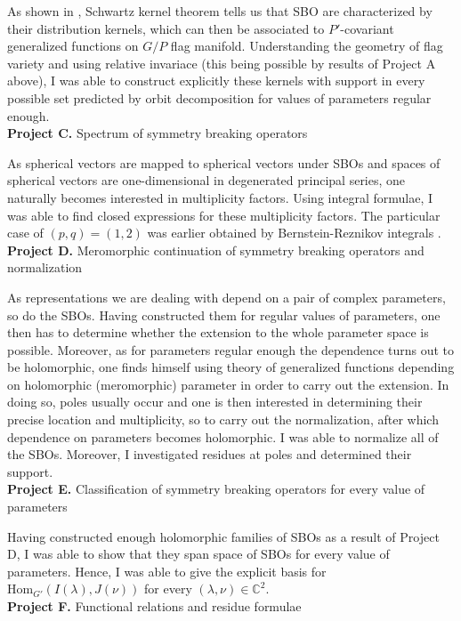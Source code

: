 \documentclass[11pt,a4paper,twoside]{jarticle}
\newcommand{\研究課題名}{Symmetry breaking operators}
\newcommand{\研究機関名}{東京大学}
\newcommand{\申請者氏名}{レオンチエフ\,オレクシィ}
\newcommand{\研究代表者氏名}{\申請者氏名}
\newcommand{\研究期間の最終元号年度}{31}	%
\begin{document}
{	As shown in \cite{KS15},
	Schwartz kernel theorem tells us that SBO are characterized by their distribution kernels,
	which can then be associated to $P'$-covariant generalized functions on $G/P$ flag manifold.
	Understanding the geometry of flag variety and using relative invariace (this being possible by results of Project A above),
	I was able to construct explicitly these kernels with support in every possible set predicted by orbit decomposition for values of parameters regular enough.\\
	\textbf{Project C.} Spectrum of symmetry breaking operators

	As spherical vectors are mapped to spherical vectors under SBOs and spaces of spherical vectors are one-dimensional in degenerated principal series,
	one naturally becomes interested in multiplicity factors. Using integral formulae,
	I was able to find closed expressions for these multiplicity factors. The particular case of $(p,q)=(1,2)$ was earlier obtained by Bernstein-Reznikov integrals \cite{CKOP11}.\\
	\textbf{Project D.} Meromorphic continuation of symmetry breaking operators and normalization

	As representations we are dealing with depend on a pair of complex parameters, so do the SBOs. Having constructed them for regular values of parameters,
	one then has to determine whether the extension to the whole parameter space is possible. Moreover, as for parameters regular enough the dependence turns out to be holomorphic,
	one finds himself using theory of generalized functions depending on holomorphic (meromorphic) parameter in order to carry out the extension. In doing so, poles usually occur and one is 
	then interested in determining their precise location and multiplicity, so to carry out the normalization, after which dependence on parameters becomes holomorphic. 
	I was able to normalize all of the SBOs. Moreover, I investigated residues at poles and determined their support.\\
	\textbf{Project E.} Classification of symmetry breaking operators for every value of parameters

	Having constructed enough holomorphic families of SBOs as a result of Project D, I was able to show that they span space of SBOs for every value of parameters. Hence, I was able to
	give the explicit basis for $\mbox{Hom}_{G'}(I\left( \lambda \right),J\left( \nu \right))$ for every $\left( \lambda,\nu \right)\in\mathbb{C}^2$.\\
	\textbf{Project F.} Functional relations and residue formulae

}
\end{document}
